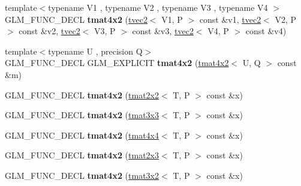 \begin{DoxyCompactItemize}
\item 
\hypertarget{structglm_1_1tmat4x2_a7cd1e8f9db551f8fd8e813c19896349f}{{\footnotesize template$<$typename V1 , typename V2 , typename V3 , typename V4 $>$ }\\G\-L\-M\-\_\-\-F\-U\-N\-C\-\_\-\-D\-E\-C\-L {\bfseries tmat4x2} (\hyperlink{structglm_1_1tvec2}{tvec2}$<$ V1, P $>$ const \&v1, \hyperlink{structglm_1_1tvec2}{tvec2}$<$ V2, P $>$ const \&v2, \hyperlink{structglm_1_1tvec2}{tvec2}$<$ V3, P $>$ const \&v3, \hyperlink{structglm_1_1tvec2}{tvec2}$<$ V4, P $>$ const \&v4)}\label{structglm_1_1tmat4x2_a7cd1e8f9db551f8fd8e813c19896349f}

\item 
\hypertarget{structglm_1_1tmat4x2_a23ca50837bdbc3d1d47bd7010bdb7fa3}{{\footnotesize template$<$typename U , precision Q$>$ }\\G\-L\-M\-\_\-\-F\-U\-N\-C\-\_\-\-D\-E\-C\-L G\-L\-M\-\_\-\-E\-X\-P\-L\-I\-C\-I\-T {\bfseries tmat4x2} (\hyperlink{structglm_1_1tmat4x2}{tmat4x2}$<$ U, Q $>$ const \&m)}\label{structglm_1_1tmat4x2_a23ca50837bdbc3d1d47bd7010bdb7fa3}

\item 
\hypertarget{structglm_1_1tmat4x2_adf75877dc039cf1917ba16de5be8510e}{G\-L\-M\-\_\-\-F\-U\-N\-C\-\_\-\-D\-E\-C\-L {\bfseries tmat4x2} (\hyperlink{structglm_1_1tmat2x2}{tmat2x2}$<$ T, P $>$ const \&x)}\label{structglm_1_1tmat4x2_adf75877dc039cf1917ba16de5be8510e}

\item 
\hypertarget{structglm_1_1tmat4x2_ac17d0b3d38b30480a59583b8821fe5c2}{G\-L\-M\-\_\-\-F\-U\-N\-C\-\_\-\-D\-E\-C\-L {\bfseries tmat4x2} (\hyperlink{structglm_1_1tmat3x3}{tmat3x3}$<$ T, P $>$ const \&x)}\label{structglm_1_1tmat4x2_ac17d0b3d38b30480a59583b8821fe5c2}

\item 
\hypertarget{structglm_1_1tmat4x2_a746f9d523f75bee0286be20a38293a2d}{G\-L\-M\-\_\-\-F\-U\-N\-C\-\_\-\-D\-E\-C\-L {\bfseries tmat4x2} (\hyperlink{structglm_1_1tmat4x4}{tmat4x4}$<$ T, P $>$ const \&x)}\label{structglm_1_1tmat4x2_a746f9d523f75bee0286be20a38293a2d}

\item 
\hypertarget{structglm_1_1tmat4x2_acecefe71f4a19f72cf988f0858036d5f}{G\-L\-M\-\_\-\-F\-U\-N\-C\-\_\-\-D\-E\-C\-L {\bfseries tmat4x2} (\hyperlink{structglm_1_1tmat2x3}{tmat2x3}$<$ T, P $>$ const \&x)}\label{structglm_1_1tmat4x2_acecefe71f4a19f72cf988f0858036d5f}

\item 
\hypertarget{structglm_1_1tmat4x2_a0a7ddc1c8f35c932b5b4084fe83d6d89}{G\-L\-M\-\_\-\-F\-U\-N\-C\-\_\-\-D\-E\-C\-L {\bfseries tmat4x2} (\hyperlink{structglm_1_1tmat3x2}{tmat3x2}$<$ T, P $>$ const \&x)}\label{structglm_1_1tmat4x2_a0a7ddc1c8f35c932b5b4084fe83d6d89}


\end{DoxyCompactItemize}
